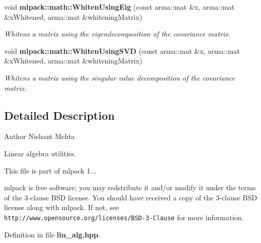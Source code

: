 \begin{DoxyCompactItemize}
void {\bf mlpack\-::math\-::\-Whiten\-Using\-Eig} (const arma\-::mat \&x, arma\-::mat \&x\-Whitened, arma\-::mat \&whitening\-Matrix)
\begin{DoxyCompactList}\small\item\em Whitens a matrix using the eigendecomposition of the covariance matrix. \end{DoxyCompactList}\item 
void {\bf mlpack\-::math\-::\-Whiten\-Using\-S\-V\-D} (const arma\-::mat \&x, arma\-::mat \&x\-Whitened, arma\-::mat \&whitening\-Matrix)
\begin{DoxyCompactList}\small\item\em Whitens a matrix using the singular value decomposition of the covariance matrix. \end{DoxyCompactList}\end{DoxyCompactItemize}


\subsection{Detailed Description}
\begin{DoxyAuthor}{Author}
Nishant Mehta
\end{DoxyAuthor}
Linear algebra utilities.

This file is part of mlpack 1...

mlpack is free software; you may redstribute it and/or modify it under the terms of the 3-\/clause B\-S\-D license. You should have received a copy of the 3-\/clause B\-S\-D license along with mlpack. If not, see {\tt http\-://www.\-opensource.\-org/licenses/\-B\-S\-D-\/3-\/\-Clause} for more information. 

Definition in file {\bf lin\-\_\-alg.\-hpp}.

